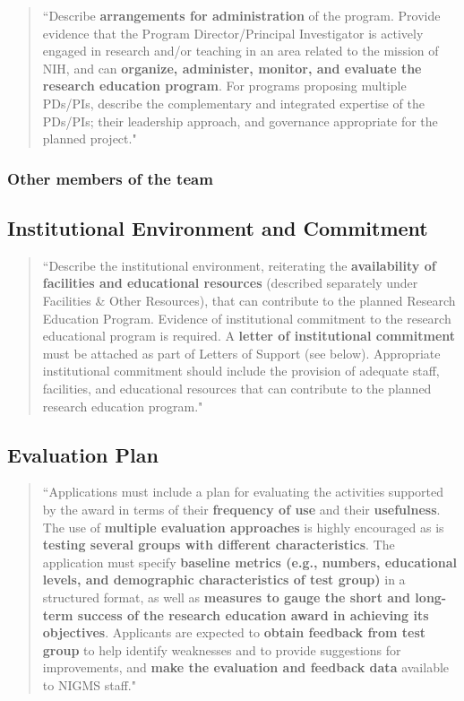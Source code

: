 \documentclass[pdftex,english,12pt,parskip=half]{scrartcl}
\begin{document}
\begin{quotation}
``Describe \textbf{arrangements for administration} of the program.  Provide evidence that the Program Director/Principal Investigator is actively engaged in research and/or teaching in an area related to the mission of NIH, and can \textbf{organize, administer, monitor, and evaluate the research education program}. For programs proposing multiple PDs/PIs, describe the complementary and integrated expertise of the PDs/PIs; their leadership approach, and governance appropriate for the planned project."
\end{quotation}

\subsubsection{Other members of the team}

\subsection{Institutional Environment and Commitment}

\begin{quotation}
``Describe the institutional environment, reiterating the \textbf{availability of facilities and educational resources} (described separately under Facilities \& Other Resources), that can contribute to the planned Research Education Program. Evidence of institutional commitment to the research educational program is required. A \textbf{letter of institutional commitment} must be attached as part of Letters of Support (see below). Appropriate institutional commitment should include the provision of adequate staff, facilities, and educational resources that can contribute to the planned research education program."
\end{quotation}

\subsection{Evaluation Plan}

\begin{quotation}
``Applications must include a plan for evaluating the activities supported by the award in terms of their \textbf{frequency of use} and their \textbf{usefulness}. The use of \textbf{multiple evaluation approaches} is highly encouraged as is \textbf{testing several groups with different characteristics}. The application must specify \textbf{baseline metrics (e.g., numbers, educational levels, and demographic characteristics of test group)} in a structured format, as well as \textbf{measures to gauge the short and long-term success of the research education award in achieving its objectives}. Applicants are expected to \textbf{obtain feedback from test group} to help identify weaknesses and to provide suggestions for improvements, and \textbf{make the evaluation and feedback data} available to NIGMS staff."
\end{quotation}
\end{document}
